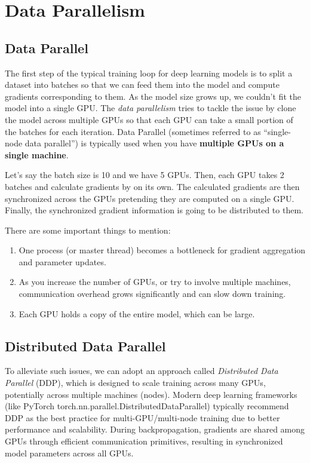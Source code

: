 \chapter{Data Parallelism}

\section{Data Parallel}
\label{sec:parallelism:data_parallelism:dp}

The first step of the typical training loop for deep learning models is to split a dataset into batches so that we can feed them into the model and compute gradients corresponding to them. As the model size grows up, we couldn't fit the model into a single GPU. The \textit{data parallelism} tries to tackle the issue by clone the model across multiple GPUs so that each GPU can take a small portion of the batches for each iteration. Data Parallel (sometimes referred to as ``single-node data parallel'') is typically used when you have \textbf{multiple GPUs on a single machine}. 

Let's say the batch size is 10 and we have 5 GPUs. Then, each GPU takes 2 batches and calculate gradients by on its own. The calculated gradients are then synchronized across the GPUs pretending they are computed on a single GPU. Finally, the synchronized gradient information is going to be distributed to them. 

There are some important things to mention: 
\begin{enumerate}
	\item One process (or master thread) becomes a bottleneck for gradient aggregation and parameter updates.
	\item As you increase the number of GPUs, or try to involve multiple machines, communication overhead grows significantly and can slow down training.
	\item Each GPU holds a copy of the entire model, which can be large.
\end{enumerate}

\section{Distributed Data Parallel}
\label{sec:parallelism:data_parallelism:ddp}
To alleviate such issues, we can adopt an approach called \textit{Distributed Data Parallel} (DDP), which is designed to scale training across many GPUs, potentially across multiple machines (nodes). Modern deep learning frameworks (like PyTorch torch.nn.parallel.DistributedDataParallel) typically recommend DDP as the best practice for multi-GPU/multi-node training due to better performance and scalability. During backpropagation, gradients are shared among GPUs through efficient communication primitives, resulting in synchronized model parameters across all GPUs.

